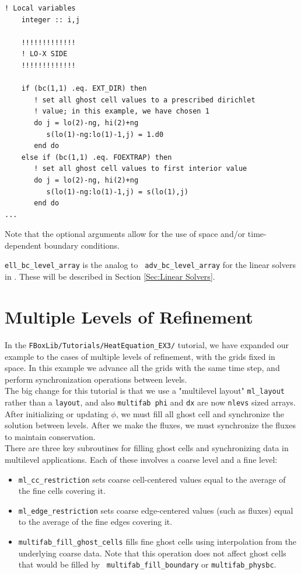 \begin{lstlisting}[backgroundcolor=\color{light-green}]
    ! Local variables
    integer :: i,j

    !!!!!!!!!!!!!
    ! LO-X SIDE
    !!!!!!!!!!!!!

    if (bc(1,1) .eq. EXT_DIR) then
       ! set all ghost cell values to a prescribed dirichlet
       ! value; in this example, we have chosen 1
       do j = lo(2)-ng, hi(2)+ng
          s(lo(1)-ng:lo(1)-1,j) = 1.d0
       end do
    else if (bc(1,1) .eq. FOEXTRAP) then
       ! set all ghost cell values to first interior value
       do j = lo(2)-ng, hi(2)+ng
          s(lo(1)-ng:lo(1)-1,j) = s(lo(1),j)
       end do
...
\end{lstlisting}

Note that the optional arguments allow for the use of space and/or
time-dependent boundary conditions.

{\tt ell\_bc\_level\_array} is the analog to {\tt
  adv\_bc\_level\_array} for the linear solvers in \FBoxLib.  These
will be described in Section \ref{Sec:Linear Solvers}.

\section{Multiple Levels of Refinement}\label{Sec:Refinement}
In the {\tt FBoxLib/Tutorials/HeatEquation\_EX3/} tutorial, we have
expanded our example to the cases of multiple levels of refinement,
with the grids fixed in space.  In this example we advance all the
grids with the same time step, and perform synchronization operations
between levels.\\

The big change for this tutorial is that we use a "multilevel layout"
{\tt ml\_layout} rather than a {\tt layout}, and also {\tt multifab
  phi} and {\tt dx} are now {\tt nlevs} sized arrays.  After
initializing or updating $\phi$, we must fill all ghost cell and
synchronize the solution between levels.  After we make the fluxes, we
must synchronize the fluxes to maintain conservation.\\

There are three key subroutines for filling ghost cells and
synchronizing data in multilevel applications.  Each of these involves
a coarse level and a fine level:
\begin{itemize}

\item {\tt ml\_cc\_restriction} sets coarse cell-centered values equal
  to the average of the fine cells covering it.

\item {\tt ml\_edge\_restriction} sets coarse edge-centered values
  (such as fluxes) equal to the average of the fine edges covering it.

\item {\tt multifab\_fill\_ghost\_cells} fills fine ghost cells using
  interpolation from the underlying coarse data.  Note that this
  operation does not affect ghost cells that would be filled by {\tt
    multifab\_fill\_boundary} or {\tt multifab\_physbc}.

\end{itemize}

